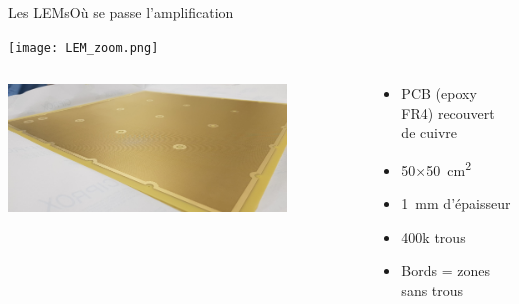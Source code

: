     \begin{frame}{Les LEMs}{Où se passe l'amplification}
        \begin{scriptsize}
            \centering\texttt{[image: LEM\_zoom.png]}
            \begin{columns}
                \begin{column}{0.5\textwidth}
                    \centering\includegraphics[width=0.8\textwidth]{./pictures/LEM.png}
                \end{column}
                \begin{column}{0.5\textwidth}
                    \begin{itemize}
                        \item PCB (epoxy FR4) recouvert de cuivre
                        \item 50$\times$\SI{50}{\centi\meter\squared}
                        \item \SI{1}{\milli\meter} d'épaisseur
                        \item 400k trous
                        \item Bords = zones sans trous
                    \end{itemize}
                \end{column}
            \end{columns}
        \end{scriptsize}
    \end{frame}
    
